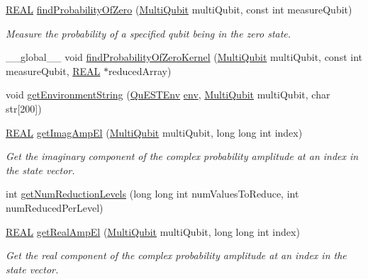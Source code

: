 \begin{DoxyCompactItemize}
\mbox{\hyperlink{QuEST__precision_8h_a4b654506f18b8bfd61ad2a29a7e38c25}{R\+E\+AL}} \mbox{\hyperlink{QuEST__env__localGPU_8cu_a2e4cedb70bd181d250b3abb945cc108e}{find\+Probability\+Of\+Zero}} (\mbox{\hyperlink{structMultiQubit}{Multi\+Qubit}} multi\+Qubit, const int measure\+Qubit)
\begin{DoxyCompactList}\small\item\em Measure the probability of a specified qubit being in the zero state. \end{DoxyCompactList}\item 
\+\_\+\+\_\+global\+\_\+\+\_\+ void \mbox{\hyperlink{QuEST__env__localGPU_8cu_aa9d9643aec790baf66e6322e591ebfd6}{find\+Probability\+Of\+Zero\+Kernel}} (\mbox{\hyperlink{structMultiQubit}{Multi\+Qubit}} multi\+Qubit, const int measure\+Qubit, \mbox{\hyperlink{QuEST__precision_8h_a4b654506f18b8bfd61ad2a29a7e38c25}{R\+E\+AL}} $\ast$reduced\+Array)
\item 
void \mbox{\hyperlink{QuEST__env__localGPU_8cu_a8f10aabf9f607f19093aee54630caa21}{get\+Environment\+String}} (\mbox{\hyperlink{structQuESTEnv}{Qu\+E\+S\+T\+Env}} \mbox{\hyperlink{runTests_8c_a5fd8ba97fcae3408ae6221dfc3cc1f93}{env}}, \mbox{\hyperlink{structMultiQubit}{Multi\+Qubit}} multi\+Qubit, char str\mbox{[}200\mbox{]})
\item 
\mbox{\hyperlink{QuEST__precision_8h_a4b654506f18b8bfd61ad2a29a7e38c25}{R\+E\+AL}} \mbox{\hyperlink{QuEST__env__localGPU_8cu_a3615f76fd5f57008d9b74bbd10533dd0}{get\+Imag\+Amp\+El}} (\mbox{\hyperlink{structMultiQubit}{Multi\+Qubit}} multi\+Qubit, long long int index)
\begin{DoxyCompactList}\small\item\em Get the imaginary component of the complex probability amplitude at an index in the state vector. \end{DoxyCompactList}\item 
int \mbox{\hyperlink{QuEST__env__localGPU_8cu_a112c74b3365bda6697813d9931b55377}{get\+Num\+Reduction\+Levels}} (long long int num\+Values\+To\+Reduce, int num\+Reduced\+Per\+Level)
\item 
\mbox{\hyperlink{QuEST__precision_8h_a4b654506f18b8bfd61ad2a29a7e38c25}{R\+E\+AL}} \mbox{\hyperlink{QuEST__env__localGPU_8cu_a317b786f577fa6bc136ea7f0ee7330a7}{get\+Real\+Amp\+El}} (\mbox{\hyperlink{structMultiQubit}{Multi\+Qubit}} multi\+Qubit, long long int index)
\begin{DoxyCompactList}\small\item\em Get the real component of the complex probability amplitude at an index in the state vector. \end{DoxyCompactList}\item 

\end{DoxyCompactItemize}
